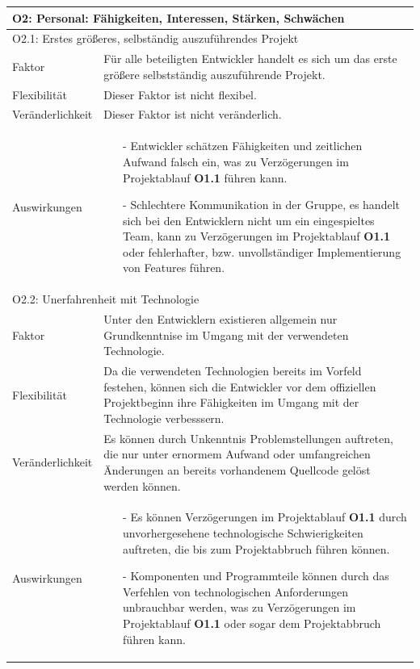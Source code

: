 \documentclass[fontsize=12pt,paper=a4,twoside]{scrartcl}
\begin{document}
\begin{tabularx}{\textwidth}{|l|X|}
\hline
\multicolumn{2}{|l|}{\textbf{O2: Personal: Fähigkeiten, Interessen, Stärken, Schwächen}}\\\hline
\multicolumn{2}{|l|}{O2.1: Erstes größeres, selbständig auszuführendes Projekt}\\\hline
 Faktor & Für alle beteiligten Entwickler handelt es sich um das erste größere selbstständig auszuführende Projekt.\\\hline
 Flexibilität & Dieser Faktor ist nicht flexibel.\\\hline
 Veränderlichkeit & Dieser Faktor ist nicht veränderlich.\\\hline
 Auswirkungen & \begin{itemize} \item[-] Entwickler schätzen Fähigkeiten und zeitlichen Aufwand falsch ein, was zu Verzögerungen im Projektablauf \textbf{O1.1} führen kann. \item[-] Schlechtere Kommunikation in der Gruppe, es handelt sich bei den Entwicklern nicht um ein eingespieltes Team, kann zu Verzögerungen im Projektablauf \textbf{O1.1} oder fehlerhafter, bzw. unvollständiger Implementierung von Features führen.  \end{itemize}
 \\\hline
 
\multicolumn{2}{|l|}{O2.2: Unerfahrenheit mit Technologie}\\\hline
 Faktor & Unter den Entwicklern existieren allgemein nur Grundkenntnise im Umgang mit der verwendeten Technologie.\\\hline
 Flexibilität & Da die verwendeten Technologien bereits im Vorfeld festehen, können sich die Entwickler vor dem offiziellen Projektbeginn ihre Fähigkeiten im Umgang mit der Technologie verbesssern.\\\hline
 Veränderlichkeit & Es können durch Unkenntnis Problemstellungen auftreten, die nur unter ernormem Aufwand oder umfangreichen Änderungen an bereits vorhandenem Quellcode gelöst werden können.\\\hline
 Auswirkungen & \begin{itemize} \item[-] Es können Verzögerungen im Projektablauf \textbf{O1.1} durch unvorhergesehene technologische Schwierigkeiten auftreten, die bis zum Projektabbruch führen können. \item[-] Komponenten und Programmteile können durch das Verfehlen von technologischen Anforderungen unbrauchbar werden, was zu Verzögerungen im Projektablauf \textbf{O1.1} oder sogar dem Projektabbruch führen kann. \end{itemize} \\\hline
\end{tabularx} 
\end{document}
